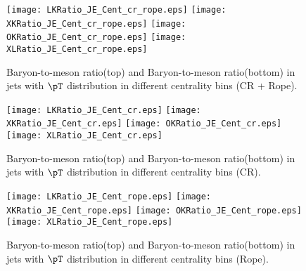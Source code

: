 \begin{figure}[ht]
        \begin{center}
                \texttt{[image: LKRatio\_JE\_Cent\_cr\_rope.eps]}
                \texttt{[image: XKRatio\_JE\_Cent\_cr\_rope.eps]}
                \texttt{[image: OKRatio\_JE\_Cent\_cr\_rope.eps]}
                \texttt{[image: XLRatio\_JE\_Cent\_cr\_rope.eps]}
        \end{center}
	\caption{Baryon-to-meson ratio(top) and Baryon-to-meson ratio(bottom) in jets with $\pT$ distribution in different centrality bins (CR + Rope).}
        \label{fig:JEParRatioCentcrandrope}
\end{figure}

\begin{figure}[ht]
        \begin{center}
                \texttt{[image: LKRatio\_JE\_Cent\_cr.eps]}
                \texttt{[image: XKRatio\_JE\_Cent\_cr.eps]}
                \texttt{[image: OKRatio\_JE\_Cent\_cr.eps]}
                \texttt{[image: XLRatio\_JE\_Cent\_cr.eps]}
        \end{center}
	\caption{Baryon-to-meson ratio(top) and Baryon-to-meson ratio(bottom) in jets with $\pT$ distribution in different centrality bins (CR).}
        \label{fig:JEParRatioCentcr}
\end{figure}
\begin{figure}[ht]
        \begin{center}
                \texttt{[image: LKRatio\_JE\_Cent\_rope.eps]}
                \texttt{[image: XKRatio\_JE\_Cent\_rope.eps]}
                \texttt{[image: OKRatio\_JE\_Cent\_rope.eps]}
                \texttt{[image: XLRatio\_JE\_Cent\_rope.eps]}
        \end{center}
	\caption{Baryon-to-meson ratio(top) and Baryon-to-meson ratio(bottom) in jets with $\pT$ distribution in different centrality bins (Rope).}
        \label{fig:JEParRatioCentrope}
\end{figure}
